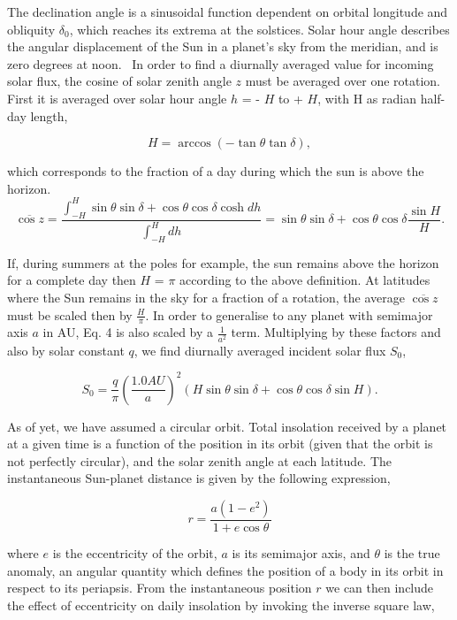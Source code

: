 \documentclass[12pt,onecolumn]{revtex4-2}    %
\begin{document}
The declination angle is a sinusoidal function dependent on orbital longitude and obliquity $\delta_{0}$, which reaches its extrema at the solstices. Solar hour angle describes the angular displacement of the Sun in a planet's sky from the meridian, and is zero degrees at noon. 
\
In order to find a diurnally averaged value for incoming solar flux, the cosine of solar zenith angle $z$ must be averaged over one rotation. First it is averaged over solar hour angle $h$ = - $H$ to + $H$, with H as radian half-day length,

\begin{equation}
H = \arccos(-\tan \theta \tan \delta),
\end{equation}

which corresponds to the fraction of a day during which the sun is above the horizon. 
\begin{equation}
\overline{\cos z} = \frac{\int_{-H}^{H} \sin\theta \sin\delta + \cos\theta \cos\delta \cosh dh}{\int_{-H}^{H} dh}
= \sin\theta \sin \delta + \cos\theta \cos\delta \frac{\sin H}{H}.
\end{equation}

If, during summers at the poles for example, the sun remains above the horizon for a complete day then $H$ = $\pi$ according to the above definition. At latitudes where the Sun remains in the sky for a fraction of a rotation, the average $\overline{\cos z}$ must be scaled then by $\frac{H}{\pi}$. In order to generalise to any planet with semimajor axis $a$ in AU, Eq. 4 is also scaled by a $\frac{1}{a^{2}}$ term. Multiplying by these factors and also by solar constant $q$, we find diurnally averaged incident solar flux $S_{0}$,

\begin{equation}
S_{0} = \frac{q}{\pi}(\frac{1.0 AU}{a})^{2}(H\sin \theta \sin \delta + \cos \theta \cos \delta \sin H).
\end{equation}

As of yet, we have assumed a circular orbit.
Total insolation received by a planet at a given time is a function of the position in its orbit (given that the orbit is not perfectly circular), and the solar zenith angle at each latitude. The instantaneous Sun-planet distance is given by the following expression,

\begin{equation}
r = \frac{a(1-e^{2})}{1 + e \cos \theta}
\end{equation}

where $e$ is the eccentricity of the orbit, $a$ is its semimajor axis, and $\theta$ is the true anomaly, an angular quantity which defines the position of a body in its orbit in respect to its periapsis. From the instantaneous position $r$ we can then include the effect of eccentricity on daily insolation by invoking the inverse square law,
\end{document}
